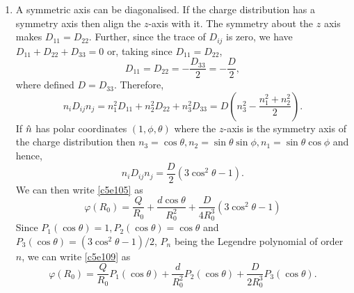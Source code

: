 \begin{enumerate}
\item A symmetric axis can be diagonalised. If the charge distribution has a 
symmetry axis then align the $z$-axis with it. The symmetry about the $z$ axis
makes $D_{11} = D_{22}$. Further, since the trace of $D_{ij}$ is zero, we have 
$D_{11} + D_{22} + D_{33} = 0$ or, taking since $D_{11} = D_{22}$,
\begin{equation}\label{c5e106}
D_{11} = D_{22} = -\frac{D_{33}}{2} = -\frac{D}{2},
\end{equation}
where defined $D = D_{33}$. Therefore,
\[
n_i D_{ij} n_j = n_1^2D_{11} + n_2^2D_{22} + n_3^2D_{33} = 
D\left(n_3^2 - \frac{n_1^2 + n_2^2}{2}\right).
\]
If $\hat{n}$ has polar coordinates $(1, \phi, \theta)$ where the $z$-axis is the 
symmetry axis of the charge distribution then $n_3 = \cos\theta, n_2 = 
\sin\theta \sin\phi, n_1 = \sin\theta\cos\phi$ and hence,
\begin{equation}\label{c5e107}
n_iD_{ij}n_j = \frac{D}{2}(3\cos^2\theta - 1).
\end{equation}
We can then write \eqref{c5e105} as
\begin{equation}\label{c5e108}
\varphi(R_0) = \frac{Q}{R_0} + \frac{d\cos\theta}{R_0^2} + 
\frac{D}{4R_0^3}(3\cos^2\theta - 1)
\end{equation}
Since $P_1(\cos\theta) = 1, P_2(\cos\theta) = \cos\theta$ and $P_3(\cos\theta)
= (3\cos^2\theta - 1)/2$, $P_n$ being the Legendre polynomial of order $n$, we 
can write \eqref{c5e109} as
\begin{equation}\label{c5e109}
\varphi(R_0) = \frac{Q}{R_0}P_1(\cos\theta) + \frac{d}{R_0^2}P_2(\cos\theta)
+ \frac{D}{2R_0^3}P_3(\cos\theta).
\end{equation}


\end{enumerate}
